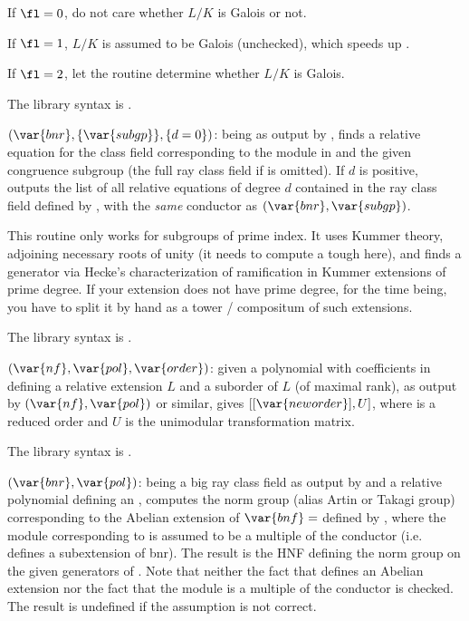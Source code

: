 If $\fl = 0$, do not care whether $L/K$ is Galois or not.

If $\fl = 1$, $L/K$ is assumed to be Galois (unchecked), which speeds up
.

If $\fl = 2$, let the routine determine whether $L/K$ is Galois.

The library syntax is .

$(\var{bnr},\{\var{subgp}\},\{d=0\})$: \label{se:rnfkummer}
being as output by , finds a relative equation for the
class field corresponding to the module in  and the given
congruence subgroup (the full ray class field if  is omitted).
If $d$ is positive, outputs the list of all relative equations of
degree $d$ contained in the ray class field defined by , with
the \emph{same} conductor as $(\var{bnr}, \var{subgp})$.

 This routine only works for subgroups of prime index. It
uses Kummer theory, adjoining necessary roots of unity (it needs to compute a
tough  here), and finds a generator via Hecke's characterization
of ramification in Kummer extensions of prime degree. If your extension does
not have prime degree, for the time being, you have to split it by hand as a
tower / compositum of such extensions.

The library syntax is .

$(\var{nf},\var{pol},\var{order})$: \label{se:rnflllgram}given a polynomial
 with coefficients in  defining a relative extension $L$ and
a suborder  of $L$ (of maximal rank), as output by
$(\var{nf},\var{pol})$ or similar, gives
$[[\var{neworder}],U]$, where  is a reduced order and $U$ is
the unimodular transformation matrix.

The library syntax is .

$(\var{bnr},\var{pol})$: \label{se:rnfnormgroup}
 being a big ray
class field as output by  and  a relative polynomial
defining an , computes the norm group (alias Artin
or Takagi group) corresponding to the Abelian extension of
$\var{bnf}=$
defined by , where the module corresponding to  is assumed
to be a multiple of the conductor (i.e.~ defines a subextension of
bnr). The result is the HNF defining the norm group on the given generators
of . Note that neither the fact that  defines an
Abelian extension nor the fact that the module is a multiple of the conductor
is checked. The result is undefined if the assumption is not correct.

